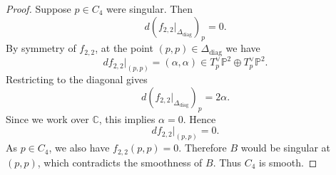 \documentclass[10pt,a4paper]{amsart}
\begin{document}
\begin{proof}
Suppose \(p\in C_4\) were singular. Then
\[
  d(f_{2,2}|_{\Delta_{\mathrm{diag}}})_p=0.
\]
By symmetry of \(f_{2,2}\), at the point \((p,p)\in\Delta_{\mathrm{diag}}\) we have
\[
  df_{2,2}|_{(p,p)}=(\alpha,\alpha)
  \in T_p^\vee\mathbb P^2\oplus T_p^\vee\mathbb P^2.
\]
Restricting to the diagonal gives
\[
  d(f_{2,2}|_{\Delta_{\mathrm{diag}}})_p=2\alpha.
\]
Since we work over \(\mathbb C\), this implies \(\alpha=0\). Hence
\[
  df_{2,2}|_{(p,p)}=0.
\]
As \(p\in C_4\), we also have \(f_{2,2}(p,p)=0\). Therefore \(B\) would be singular
at \((p,p)\), which contradicts the smoothness of \(B\). Thus \(C_4\) is smooth.
\end{proof}
\end{document}
